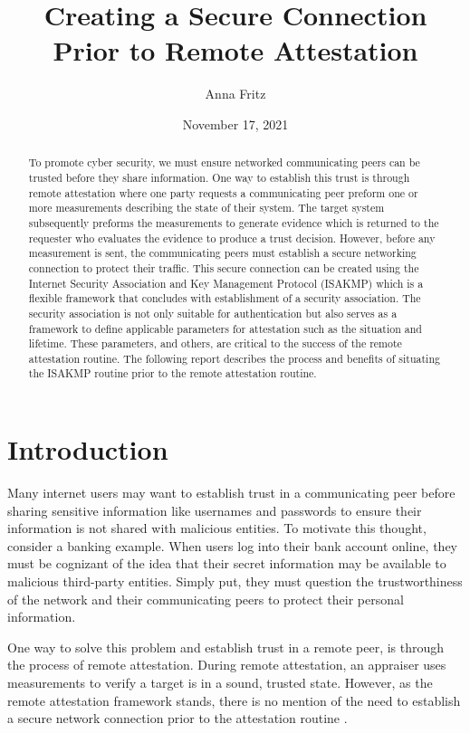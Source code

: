 \documentclass[12pt, letterpaper, twoside]{article}
\title{Creating a Secure Connection Prior to Remote Attestation}
\author{Anna Fritz}
\date{November 17, 2021}
\begin{document}
\begin{titlepage}
    \maketitle
\end{titlepage}

\tableofcontents
\newpage

\begin{abstract}
    To promote cyber security, we must ensure networked communicating peers can be trusted before they share information. One way to establish this trust is through remote attestation where one party requests a communicating peer preform one or more measurements describing the state of their system. The target system subsequently preforms the measurements to generate evidence which is returned to the requester who evaluates the evidence to produce a trust decision. However, before any measurement is sent, the communicating peers must establish a secure networking connection to protect their traffic. This secure connection can be created using the Internet Security Association and Key Management Protocol (ISAKMP) which is a flexible framework that concludes with establishment of a security association. The security association is not only suitable for authentication but also serves as a framework to define applicable parameters for attestation such as the situation and lifetime. These parameters, and others, are critical to the success of the remote attestation routine. The following report describes the process and benefits of situating the ISAKMP routine prior to the remote attestation routine. 
\end{abstract}

\section{Introduction}
Many internet users may want to establish trust in a communicating peer before sharing sensitive information like usernames and passwords to ensure their information is not shared with malicious entities. To motivate this thought, consider a banking example. When users log into their bank account online, they must be cognizant of the idea that their secret information may be available to malicious third-party entities. Simply put, they must question the trustworthiness of the network and their communicating peers to protect their personal information. 

One way to solve this problem and establish trust in a remote peer, is through the process of remote attestation. During remote attestation, an appraiser uses measurements to verify a target is in a sound, trusted state. However, as the remote attestation framework stands, there is no mention of the need to establish a secure network connection prior to the attestation routine \cite{flexible}. 
\end{document}
